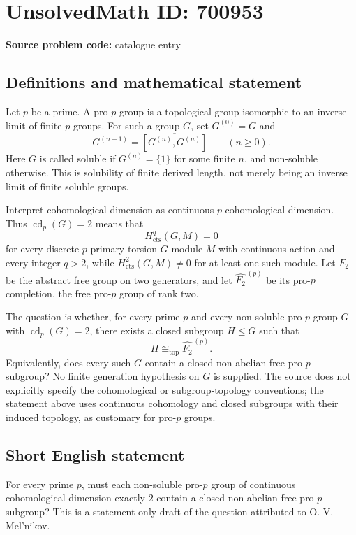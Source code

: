 \documentclass[11pt]{article}
\begin{document}
\section*{UnsolvedMath ID: 700953}
\textbf{Source problem code:} catalogue entry
\subsection{Definitions and mathematical statement}
Let \(p\) be a prime. A pro-\(p\) group is a topological group isomorphic to an inverse limit of finite \(p\)-groups. For such a group \(G\), set \(G^{(0)}=G\) and
\[
G^{(n+1)}=\overline{[G^{(n)},G^{(n)}]}\qquad(n\geq 0).
\]
Here \(G\) is called soluble if \(G^{(n)}=\{1\}\) for some finite \(n\), and non-soluble otherwise. This is solubility of finite derived length, not merely being an inverse limit of finite soluble groups.

Interpret cohomological dimension as continuous \(p\)-cohomological dimension. Thus \(\operatorname{cd}_p(G)=2\) means that
\[
H^q_{\mathrm{cts}}(G,M)=0
\]
for every discrete \(p\)-primary torsion \(G\)-module \(M\) with continuous action and every integer \(q>2\), while \(H^2_{\mathrm{cts}}(G,M)\neq 0\) for at least one such module. Let \(F_2\) be the abstract free group on two generators, and let \(\widehat{F_2}^{\,(p)}\) be its pro-\(p\) completion, the free pro-\(p\) group of rank two.

The question is whether, for every prime \(p\) and every non-soluble pro-\(p\) group \(G\) with \(\operatorname{cd}_p(G)=2\), there exists a closed subgroup \(H\leq G\) such that
\[
H\cong_{\mathrm{top}}\widehat{F_2}^{\,(p)}.
\]
Equivalently, does every such \(G\) contain a closed non-abelian free pro-\(p\) subgroup? No finite generation hypothesis on \(G\) is supplied. The source does not explicitly specify the cohomological or subgroup-topology conventions; the statement above uses continuous cohomology and closed subgroups with their induced topology, as customary for pro-\(p\) groups.
\subsection{Short English statement}
For every prime \(p\), must each non-soluble pro-\(p\) group of continuous cohomological dimension exactly \(2\) contain a closed non-abelian free pro-\(p\) subgroup? This is a statement-only draft of the question attributed to O. V. Mel'nikov.
\end{document}
